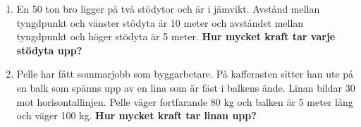 \documentclass[11pt]{article}
\begin{document}
\begin{enumerate}[itemsep=2em]
        \item
              En 50 ton bro ligger på två stödytor och är i jämvikt.  Avstånd mellan tyngdpunkt och vänster stödyta är 10 meter och avståndet mellan tyngdpunkt och höger stödyta är 5 meter.
              \textbf{Hur mycket kraft tar varje stödyta upp?}
              \begin{center}
                      
              \end{center}

        \item
              Pelle har fått sommarjobb som byggarbetare. På kafferasten sitter han ute på en balk som spänns upp av en lina som är fäst i balkens ände. Linan bildar 30\degree{} mot horisontallinjen. Pelle väger fortfarande 80 kg och balken är 5 meter lång och väger 100 kg. \textbf{Hur mycket kraft tar linan upp?}
              \begin{center}
                      
              \end{center}

\end{enumerate}
\end{document}
